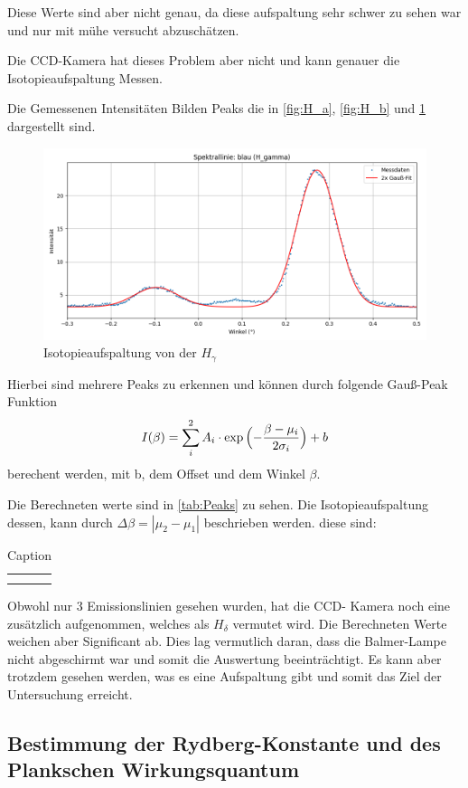 Diese Werte sind aber nicht genau, da diese aufspaltung sehr schwer zu sehen war und nur mit mühe versucht abzuschätzen.

Die CCD-Kamera hat dieses Problem aber nicht und kann genauer die Isotopieaufspaltung Messen.

Die Gemessenen Intensitäten Bilden Peaks die in \cref{fig:H_a}, \cref{fig:H_b} und \cref{fig:H_g} dargestellt sind. 
\begin{figure}
    \centering
    \includegraphics[width=0.5\linewidth]{figs/dt_lila_145_51_5}
    \caption{Isotopieaufspaltung von der $H_{\gamma}$}
    \label{fig:H_g}
\end{figure}

Hierbei sind mehrere Peaks zu erkennen und können durch folgende Gauß-Peak Funktion 
\begin{equation}
    I(\beta) = \sum_i^2 A_i \cdot \exp{\Bigl(-\frac{\beta-\mu_i}{2\sigma_i}}\Bigr) +b
\end{equation}
berechent werden, mit b, dem Offset und dem Winkel $\beta$. 

Die Berechneten werte sind in \cref{tab:Peaks} zu sehen.
Die Isotopieaufspaltung dessen, kann durch 
$\Delta\beta = |\mu_2 - \mu_1|$
beschrieben werden. 
diese sind:
\begin{table}[htbp]
    \centering
    \begin{tabular}{c|c}
         &  \\
         & 
    \end{tabular}
    \caption{Caption}
    \label{tab:my_label}
\end{table}
Obwohl nur 3 Emissionslinien gesehen wurden, hat die CCD- Kamera noch eine zusätzlich aufgenommen, welches als $H_\delta$ vermutet wird.
Die Berechneten Werte weichen aber Significant ab.
Dies lag vermutlich daran, dass die Balmer-Lampe nicht abgeschirmt war und somit die Auswertung beeinträchtigt. 
Es kann aber trotzdem gesehen werden, was es eine Aufspaltung gibt und somit das Ziel der Untersuchung erreicht.

\subsection{Bestimmung der Rydberg-Konstante und des Plankschen Wirkungsquantum}
